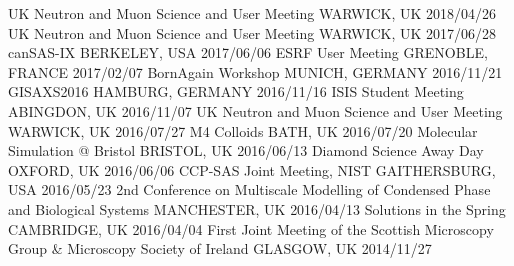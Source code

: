 \begin{cvhonors}
  \cvhonornb
    {UK Neutron and Muon Science and User Meeting}
    {WARWICK, UK}
    {2018/04/26}
  \cvhonornb
    {UK Neutron and Muon Science and User Meeting}
    {WARWICK, UK}
    {2017/06/28}
  \cvhonornb
    {canSAS-IX}
    {BERKELEY, USA}
    {2017/06/06}
  \cvhonornb
    {ESRF User Meeting}
    {GRENOBLE, FRANCE}
    {2017/02/07}
  \cvhonornb
    {BornAgain Workshop}
    {MUNICH, GERMANY}
    {2016/11/21}
  \cvhonornb
    {GISAXS2016}
    {HAMBURG, GERMANY}
    {2016/11/16}
  \cvhonornb
    {ISIS Student Meeting}
    {ABINGDON, UK}
    {2016/11/07}
  \cvhonornb
    {UK Neutron and Muon Science and User Meeting}
    {WARWICK, UK}
    {2016/07/27}
  \cvhonornb
    {M4 Colloids}
    {BATH, UK}
    {2016/07/20}
  \cvhonornb
    {Molecular Simulation @ Bristol}
    {BRISTOL, UK}
    {2016/06/13}
  \cvhonornb
    {Diamond Science Away Day}
    {OXFORD, UK}
    {2016/06/06}
  \cvhonornb
    {CCP-SAS Joint Meeting, NIST}
    {GAITHERSBURG, USA}
    {2016/05/23}
  \cvhonornb
    {2nd Conference on Multiscale Modelling of Condensed Phase and Biological Systems}
    {MANCHESTER, UK}
    {2016/04/13}
  \cvhonornb
    {Solutions in the Spring}
    {CAMBRIDGE, UK}
    {2016/04/04}
  \cvhonornb
    {First Joint Meeting of the Scottish Microscopy Group \& Microscopy Society of Ireland}
    {GLASGOW, UK}
    {2014/11/27}
\end{cvhonors}

